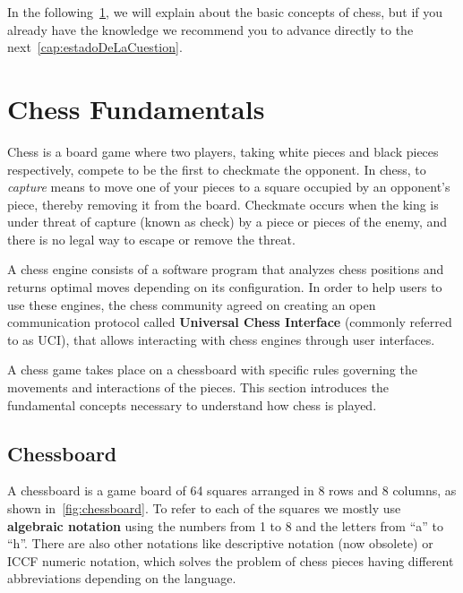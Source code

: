 \vspace{1em}

\noindent In the following~\cref{sec:basicConcepts}, we will explain about the basic concepts of chess, but if you already have the knowledge we recommend you to advance directly to the next~\cref{cap:estadoDeLaCuestion}.

\section{Chess Fundamentals}\label{sec:basicConcepts}

\noindent Chess is a board game where two players, taking white pieces and black pieces respectively, compete to be the first to checkmate the opponent. In chess, to \textit{capture} means to move one of your pieces to a square occupied by an opponent's piece, thereby removing it from the board. Checkmate occurs when the king is under threat of capture (known as check) by a piece or pieces of the enemy, and there is no legal way to escape or remove the threat.

\vspace{1em}

\noindent A chess engine consists of a software program that analyzes chess positions and returns optimal moves depending on its configuration. In order to help users to use these engines, the chess community agreed on creating an open communication protocol called \textbf{Universal Chess Interface} (commonly referred to as UCI), that allows interacting with chess engines through user interfaces.

\vspace{1em}

\noindent A chess game takes place on a chessboard with specific rules governing the movements and interactions of the pieces. This section introduces the fundamental concepts necessary to understand how chess is played.

\subsection{Chessboard}\label{sec:chessboard}

A chessboard is a game board of 64 squares arranged in 8 rows and 8 columns, as shown in~\cref{fig:chessboard}. To refer to each of the squares we mostly use \textbf{algebraic notation} using the numbers from 1 to 8 and the letters from ``a'' to ``h''. There are also other notations like descriptive notation (now obsolete) or ICCF numeric notation, which solves the problem of chess pieces having different abbreviations depending on the language.


